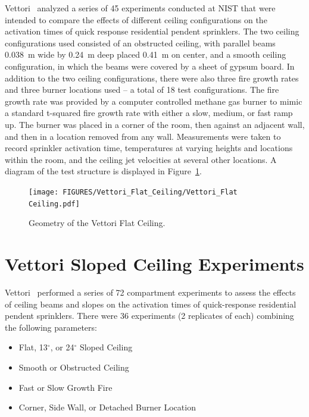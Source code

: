 Vettori~\cite{Vettori:1} analyzed a series of 45 experiments conducted at NIST that were intended to compare the effects of different ceiling configurations on the activation times of quick response residential pendent sprinklers. The two ceiling configurations used consisted of an obstructed ceiling, with parallel beams 0.038~m wide by 0.24~m deep placed 0.41~m on center, and a smooth ceiling configuration, in which the beams were covered by a sheet of gypsum board.  In addition to the two ceiling configurations, there were also three fire growth rates and three burner locations used -- a total of 18 test configurations. The fire growth rate was provided by a computer controlled methane gas burner to mimic a standard t-squared fire growth rate with either a slow, medium, or fast ramp up. The burner was placed in a corner of the room, then against an adjacent wall, and then in a location removed from any wall. Measurements were taken to record sprinkler activation time, temperatures at varying heights and locations within the room, and the ceiling jet velocities at several other locations.  A diagram of the test structure is displayed in Figure~\ref{Vettori_Drawing}.

\begin{figure}
\begin{center}
\texttt{[image: FIGURES/Vettori\_Flat\_Ceiling/Vettori\_Flat Ceiling.pdf]}
\end{center}
\caption{Geometry of the Vettori Flat Ceiling.}
\label{Vettori_Drawing}
\end{figure}


\section{Vettori Sloped Ceiling Experiments}

Vettori~\cite{Vettori:2} performed a series of 72 compartment experiments to assess the effects of ceiling beams and slopes on the activation times of quick-response residential pendent sprinklers. There were 36 experiments (2 replicates of each) combining the following parameters:
\begin{itemize}
\item Flat, 13$^\circ$, or 24$^\circ$ Sloped Ceiling
\item Smooth or Obstructed Ceiling
\item Fast or Slow Growth Fire
\item Corner, Side Wall, or Detached Burner Location
\end{itemize}



